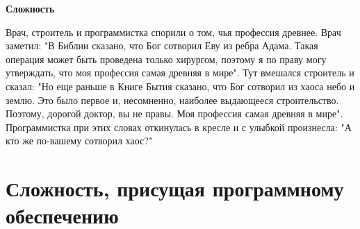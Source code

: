 \documentclass[a4paper,12pt]{article}
\begin{document}
\begin{center}
\begin{LARGE}
\textbf{Сложность}\\
\end{LARGE}
\end{center}

\footnotesize{ 
\hspace*{7.94 cm}
Врач, строитель и программистка спорили о том, чья профессия древнее. Врач заметил: "В Библии сказано, что Бог сотворил Еву из ребра Адама. Такая операция может быть проведена только хирургом, поэтому я по праву могу утверждать, что моя профессия самая древняя в мире". Тут вмешался строитель и сказал: "Но еще раньше в Книге Бытия сказано, что Бог сотворил из хаоса небо и землю. Это было первое и, несомненно, наиболее выдающееся строительство. Поэтому, дорогой доктор, вы не правы. Моя профессия самая древняя в мире". Программистка при этих словах откинулась в кресле и с улыбкой произнесла: "А кто же по-вашему сотворил хаос?" \\
}
\section{Сложность, присущая программному обеспечению }
\end{document}
